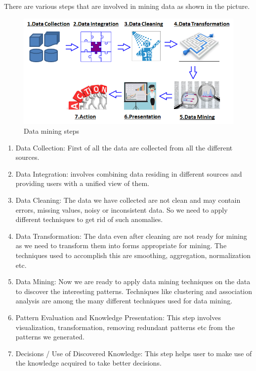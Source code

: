 \documentclass[fleqn,10pt]{SelfArx} %
\begin{document}
There are various steps that are involved in mining data as shown in the picture.
\begin{figure}[ht]\centering
\includegraphics[width=\linewidth]{Dataminingsteps}
\caption{Data mining steps}
\label{fig:Dataminingsteps}
\end{figure}
\begin{enumerate}
\item Data Collection: First of all the data are collected from all the different sources.
\item Data Integration: involves combining data residing in different sources and providing users with a unified view of them.
\item Data Cleaning: The data we have collected are not clean and may contain errors, missing values, noisy or inconsistent data. So we need to apply different techniques to get rid of such anomalies.
\item Data Transformation: The data even after cleaning are not ready for mining as we need to transform them into forms appropriate for mining. The techniques used to accomplish this are smoothing, aggregation, normalization etc.
\item Data Mining: Now we are ready to apply data mining techniques on the data to discover the interesting patterns. Techniques like clustering and association analysis are among the many different techniques used for data mining. 
\item Pattern Evaluation and Knowledge Presentation: This step involves visualization, transformation, removing redundant patterns etc from the patterns we generated.
\item Decisions / Use of Discovered Knowledge: This step helps user to make use of the knowledge acquired to take better decisions.
\end{enumerate}
\end{document}
